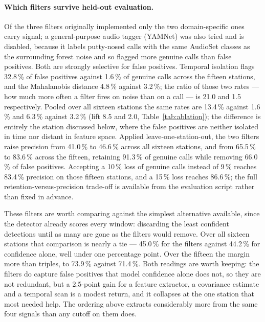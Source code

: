 \documentclass[final,3p,times]{elsarticle}
\begin{document}
\paragraph{Which filters survive held-out evaluation.}
Of the three filters originally implemented only the two domain-specific ones
carry signal; a general-purpose audio tagger (YAMNet) was also tried and is
disabled, because it labels putty-nosed calls with the same AudioSet classes as
the surrounding forest noise and so flagged more genuine calls than false
positives.
Both are strongly selective for false positives. Temporal isolation flags
32.8\,\% of false positives against 1.6\,\% of genuine calls across the fifteen
stations, and the Mahalanobis distance 4.8\,\% against 3.2\,\%; the ratio of
those two rates --- how much more often a filter fires on noise than on a call
--- is 21.0 and 1.5 respectively. Pooled over all sixteen stations the same
rates are 13.4\,\% against 1.6\,\% and 6.3\,\% against 3.2\,\% (lift 8.5 and
2.0, Table~\ref{tab:ablation}); the difference is entirely the station discussed
below, where the false positives are neither isolated in time nor distant in
feature space. Applied leave-one-station-out, the two filters raise precision
from 41.0\,\% to 46.6\,\% across all sixteen stations, and from 65.5\,\% to
83.6\,\% across the fifteen, retaining 91.3\,\% of genuine calls while removing
66.0\,\% of false positives. Accepting a 10\,\% loss of genuine calls instead of
9\,\% reaches 83.4\,\% precision on those fifteen stations, and a 15\,\% loss
reaches 86.6\,\%; the full retention-versus-precision trade-off is available
from the evaluation script rather than fixed in advance.

These filters are worth comparing against the simplest alternative available,
since the detector already scores every window: discarding the least confident
detections until as many are gone as the filters would remove. Over all sixteen
stations that comparison is nearly a tie --- 45.0\,\% for the filters against
44.2\,\% for confidence alone, well under one percentage point. Over the fifteen
the margin more than triples, to 73.9\,\% against 71.4\,\%. Both readings are
worth keeping: the filters do capture false positives that model confidence
alone does not, so they are not redundant, but a 2.5-point gain for a feature
extractor, a covariance estimate and a temporal scan is a modest return, and it
collapses at the one station that most needed help. The ordering above extracts
considerably more from the same four signals than any cutoff on them does.
\end{document}
